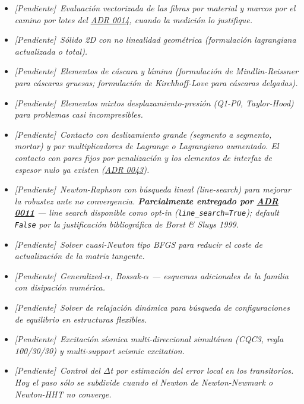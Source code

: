 \documentclass[11pt,oneside]{report}
\newcommand{\pendiente}[1]{\textcolor{pendienteorange}{\textit{[Pendiente]}~\textcolor{pendienteorange}{\textit{#1}}}}
\begin{document}
\begin{itemize}
  \item \pendiente{Evaluación vectorizada de las fibras por material y marcos por el camino por lotes del \hyperref[adr:0014]{ADR 0014}, cuando la medición lo justifique.}

  \item \pendiente{Sólido 2D con no linealidad geométrica (formulación lagrangiana actualizada o total).}

  \item \pendiente{Elementos de cáscara y lámina (formulación de Mindlin-Reissner para cáscaras gruesas; formulación de Kirchhoff-Love para cáscaras delgadas).}

  \item \pendiente{Elementos mixtos desplazamiento-presión (Q1-P0, Taylor-Hood) para problemas casi incompresibles.}

  \item \pendiente{Contacto con deslizamiento grande (segmento a segmento, \textit{mortar}) y por multiplicadores de Lagrange o Lagrangiano aumentado. El contacto con pares fijos por penalización y los elementos de interfaz de espesor nulo ya existen (\hyperref[adr:0043]{ADR 0043}).}

  \item \pendiente{Newton-Raphson con búsqueda lineal (line-search) para mejorar la robustez ante no convergencia. \textbf{Parcialmente entregado por \hyperref[adr:0011]{ADR 0011}} --- line search disponible como opt-in (\texttt{line\_search=True}); default \texttt{False} por la justificación bibliográfica de Borst \& Sluys 1999.}

  \item \pendiente{Solver cuasi-Newton tipo BFGS para reducir el coste de actualización de la matriz tangente.}

  \item \pendiente{Generalized-\ensuremath{\alpha}, Bossak-\ensuremath{\alpha} --- esquemas adicionales de la familia con disipación numérica.}

  \item \pendiente{Solver de relajación dinámica para búsqueda de configuraciones de equilibrio en estructuras flexibles.}

  \item \pendiente{Excitación sísmica multi-direccional simultánea (CQC3, regla 100/30/30) y multi-support seismic excitation.}

  \item \pendiente{Control del \ensuremath{\Delta}t por estimación del error local en los transitorios. Hoy el paso sólo se subdivide cuando el Newton de Newton-Newmark o Newton-HHT no converge.}


\end{itemize}
\end{document}

